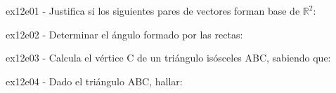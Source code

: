 \documentclass[spanish, 11pt]{exam}
\begin{document}
        \begin{questions}
        \question ex12e01 - Justifica si los siguientes pares de vectores forman base de $\mathbb{R}^2$:
        \begin{multicols}{2} 
        \end{multicols}
        \question ex12e02 - Determinar el ángulo formado por las rectas:
        \begin{multicols}{2} 
        \end{multicols}
        \question ex12e03 - Calcula el vértice C de un triángulo isósceles ABC, sabiendo que:
        \begin{multicols}{1} 
        \end{multicols}
        \question ex12e04 - Dado el triángulo ABC, hallar: \\ 

\end{questions}
\end{document}
